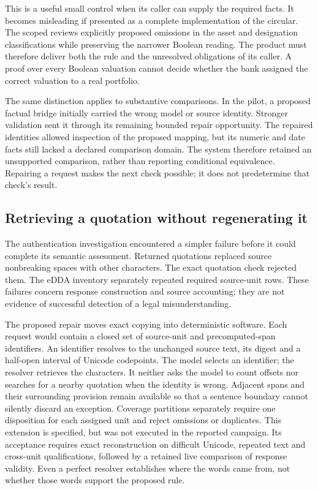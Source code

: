 This is a useful small control when its caller can supply the required facts.
It becomes misleading if presented as a complete implementation of the
circular. The scoped reviews explicitly proposed omissions in the asset and
designation classifications while preserving the narrower Boolean reading.
The product must therefore deliver both the rule and the unresolved obligations
of its caller. A proof over every Boolean valuation cannot decide whether the
bank assigned the correct valuation to a real portfolio.

The same distinction applies to substantive comparisons. In the pilot, a
proposed factual bridge initially carried the wrong model or source identity.
Stronger validation sent it through its remaining bounded repair opportunity.
The repaired identities allowed inspection of the proposed mapping, but its
numeric and date facts still lacked a declared comparison domain. The system
therefore retained an unsupported comparison, rather than reporting conditional
equivalence. Repairing a request makes the next check possible; it does not
predetermine that check's result.

\subsection{Retrieving a quotation without regenerating it}

The authentication investigation encountered a simpler failure before it could
complete its semantic assessment. Returned quotations replaced source
nonbreaking spaces with other characters. The exact quotation check rejected
them. The eDDA inventory separately repeated required source-unit rows. These
failures concern response construction and source accounting; they are not
evidence of successful detection of a legal misunderstanding.

The proposed repair moves exact copying into deterministic software. Each
request would contain a closed set of source-unit and precomputed-span
identifiers. An identifier resolves to the unchanged source text, its digest
and a half-open interval of Unicode codepoints. The model selects an identifier;
the resolver retrieves the characters. It neither asks the model to count
offsets nor searches for a nearby quotation when the identity is wrong.
Adjacent spans and their surrounding provision remain available so that a
sentence boundary cannot silently discard an exception. Coverage partitions
separately require one disposition for each assigned unit and reject omissions
or duplicates. This extension is specified, but was not executed in the
reported campaign. Its acceptance requires exact reconstruction on difficult
Unicode, repeated text and cross-unit qualifications, followed by a retained
live comparison of response validity. Even a perfect resolver establishes
where the words came from, not whether those words support the proposed rule.


